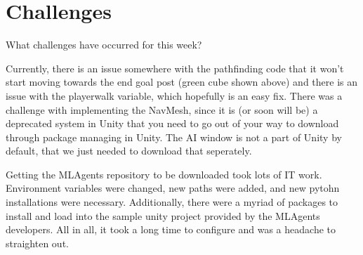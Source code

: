 \section{Challenges}

What challenges have occurred for this week?

Currently, there is an issue somewhere with the pathfinding code that it won't start moving towards the end goal post (green cube shown above) and there is an issue with the playerwalk variable, which hopefully is an easy fix. There was a challenge with implementing the NavMesh, since it is (or soon will be) a deprecated  system in Unity that you need to go out of your way to download through package managing in Unity. The AI window is not a part of Unity by default, that we just needed to download that seperately. 

Getting the MLAgents repository to be downloaded took lots of IT work. Environment variables were changed, new paths were added, and new pytohn installations were necessary. Additionally, there were a myriad of packages to install and load into the sample unity project provided by the MLAgents developers. All in all, it took a long time to configure and was a headache to straighten out.